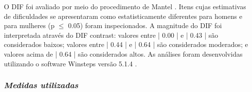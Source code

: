 O DIF foi avaliado por meio do procedimento de Mantel \cite{Bond2020ApplyingSciences}. Itens cujas estimativas de dificuldades se apresentaram como estatisticamente diferentes para homens e para mulheres (p $\leq$ 0.05) foram inspecionados. A magnitude do DIF foi interpretada através do DIF contrast: valores entre | 0.00 | e | 0.43 | são considerados baixos; valores entre | 0.44 | e | 0.64 | são considerados moderados; e valores acima de | 0.64 | são considerados altos. As análises foram desenvolvidas utilizando o software Winsteps versão 5.1.4 \cite{Linacre2012WinstepsGuide}.



\subsubsection{\textit{Medidas utilizadas}}






\newpage

